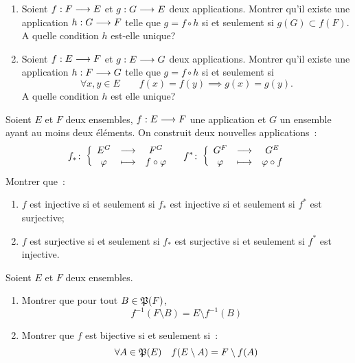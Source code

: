 \begin{exercice}
  \begin{enumerate}
    \item Soient \(f:F \longrightarrow E\) et \(g:G \longrightarrow E\) deux 
      applications. Montrer qu'il existe une application 
      \(h:G \longrightarrow F\) telle que \(g = f \circ h\) si et seulement 
      si \(g(G) \subset f(F)\). A quelle condition \(h\) est-elle unique?
    \item Soient \(f:E \longrightarrow F\) et \(g:E \longrightarrow G\) deux 
      applications. Montrer qu'il existe une application 
      \(h:F \longrightarrow G\) telle que \(g = f \circ h\) si et seulement 
      si 
      \begin{equation}
        \forall x,y \in E \qquad f(x) = f(y) \implies g(x) = g(y).
      \end{equation}
      A quelle condition \(h\) est elle unique?
  \end{enumerate}
\end{exercice}

\begin{exercice}
  Soient \(E\) et \(F\) deux ensembles, \(f:E \longrightarrow F\) une 
  application et \(G\) un ensemble ayant au moins deux éléments. On construit 
  deux nouvelles applications~:
  \begin{equation}
    f_{*}\colon \left\{\begin{array}{ccc} E^G & \longrightarrow &F^G\\ \varphi & \longmapsto & f \circ \varphi \end{array} \right. \quad 
    f^{*}\colon \left\{\begin{array}{ccc} G^F & \longrightarrow &G^E\\ \varphi & \longmapsto & \varphi \circ f \end{array} \right.
  \end{equation}
  Montrer que~:
  \begin{enumerate}
    \item \(f\) est injective si et seulement si \(f_{*}\) est injective si 
      et seulement si \(f^{*}\) est surjective;
    \item \(f\) est surjective si et seulement si \(f_{*}\) est surjective 
      si et seulement si \(f^{*}\) est injective.
  \end{enumerate}
\end{exercice}

\begin{exercice}
  Soient \(E\) et \(F\) deux ensembles.
  \begin{enumerate}
    \item Montrer que pour tout \(B \in \mathfrak{P}(F)\),
      \begin{equation}
        f^{-1}(F\setminus B) = E \setminus f^{-1}(B)
      \end{equation}
    \item Montrer que \(f\) est bijective si et seulement si~:
      \begin{equation}
        \forall A \in \mathfrak{P}(E) \quad f(E\setminus A) = F\setminus f(A)
      \end{equation}
  \end{enumerate}
\end{exercice}

